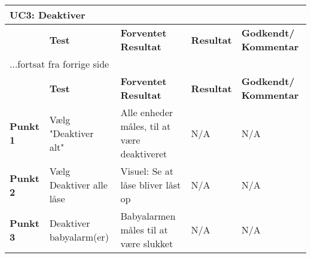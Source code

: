 
\begin{center}
\begin{longtable}{|p{}|p{}|p{3cm}|p{3cm}|p{3cm}|} %
\hline
\multicolumn{5}{|l|}{\textbf{UC3: Deaktiver}} \\ \hline
\multicolumn{1}{|c|}{} &
\textbf{Test} &
\textbf{Forventet \newline Resultat} &
\textbf{Resultat} &
\textbf{Godkendt/ \newline Kommentar} \\ \hline 
\endfirsthead

\multicolumn{5}{l}{...fortsat fra forrige side} \\ \hline 
\multicolumn{1}{|c|}{} &
\textbf{Test} &
\textbf{Forventet \newline Resultat} &
\textbf{Resultat} &
\textbf{Godkendt/ \newline Kommentar} \\ \hline 
\endhead


\textbf{Punkt 1}	&
Vælg "Deaktiver alt" &
Alle enheder måles, til at være deaktiveret &
N/A &
N/A \\\hline
\textbf{Punkt 2} &
Vælg Deaktiver alle låse &
Visuel: Se at låse bliver låst op &
N/A	&
N/A \\\hline
\textbf{Punkt 3} &
Deaktiver \newline babyalarm(er) &
Babyalarmen måles til at være slukket &
N/A &
N/A \\\hline
	\end{longtable}
	\label{ATUC3} 
\end{center}